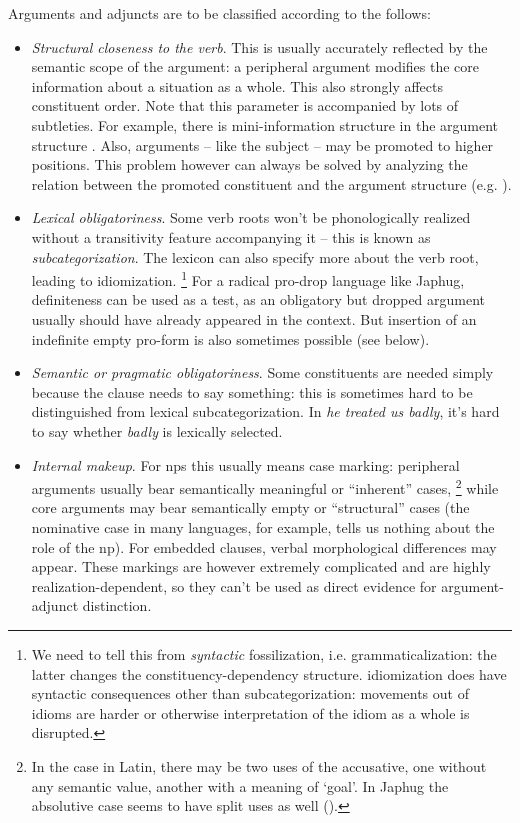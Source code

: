 \documentclass[a4paper, oneside, 12pt]{report}
\newcommand*{\term}[1]{\emph{#1}}
\newcommand{\form}[1]{\emph{#1}}
\newcommand{\translate}[1]{`#1'}
\begin{document}
Arguments and adjuncts are to be classified according to the follows:
\begin{itemize}
    \item \emph{Structural closeness to the verb}.
    This is usually accurately reflected by the semantic scope of the argument:
    a peripheral argument modifies the core information about a situation as a whole.
    This also strongly affects constituent order.
    Note that this parameter is accompanied by lots of subtleties.
    For example, there is mini-information structure in the argument structure \citep{devine2006latin}.
    Also, arguments -- like the subject -- may be promoted to higher positions.
    This problem however can always be solved by analyzing the relation 
    between the promoted constituent and the argument structure
    (e.g. ).

    \item \emph{Lexical obligatoriness}.
    Some verb roots won't be phonologically realized without a transitivity feature accompanying it
    -- this is known as \term{subcategorization}.
    The lexicon can also specify more about the verb root,
    leading to idiomization.%
    \footnote{
        We need to tell this from \emph{syntactic} fossilization, i.e. grammaticalization:
        the latter changes the constituency-dependency structure.
        idiomization does have syntactic consequences other than subcategorization:
        movements out of idioms are harder or otherwise interpretation of the idiom as a whole is disrupted.
    }
    For a radical pro-drop language like Japhug,
    definiteness can be used as a test,
    as an obligatory but dropped argument usually should have already appeared in the context.
    But insertion of an indefinite empty pro-form is also sometimes possible (see below).
    
    \item \emph{Semantic or pragmatic obligatoriness}.
    Some constituents are needed simply because the clause needs to say something:
    this is sometimes hard to be distinguished from lexical subcategorization.
    In \form{he treated us badly}, it's hard to say whether \form{badly} is lexically selected.

    \item \emph{Internal makeup}.
    For \acp{np} this usually means case marking:
    peripheral arguments usually bear semantically meaningful or ``inherent'' cases,%
    \footnote{
        In the case in Latin, there may be two uses of the accusative,
        one without any semantic value,
        another with a meaning of \translate{goal}.
        In Japhug the absolutive case seems to have split uses as well
        (). 
    }
    while core arguments may bear semantically empty or ``structural'' cases
    (the nominative case in many languages, for example,
    tells us nothing about the role of the \ac{np}).
    For embedded clauses, verbal morphological differences may appear.
    These markings are however extremely complicated and are highly realization-dependent,
    so they can't be used as direct evidence for argument-adjunct distinction.
\end{itemize}
\end{document}
